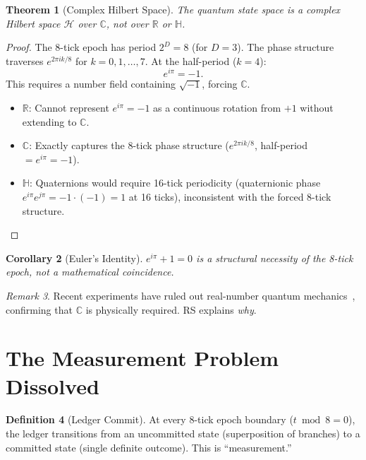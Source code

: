 \documentclass[12pt,a4paper]{article}
\newtheorem{theorem}{Theorem}[section]
\newtheorem{corollary}[theorem]{Corollary}
\theoremstyle{definition}
\newtheorem{definition}[theorem]{Definition}
\theoremstyle{remark}
\newtheorem{remark}[theorem]{Remark}
\begin{document}
\begin{theorem}[Complex Hilbert Space]
\label{thm:complex}
The quantum state space is a complex Hilbert space $\mathcal{H}$
over $\mathbb{C}$, not over $\mathbb{R}$ or $\mathbb{H}$.
\end{theorem}

\begin{proof}
The 8-tick epoch has period $2^D = 8$ (for $D = 3$).  The phase
structure traverses $e^{2\pi i k/8}$ for $k = 0, 1, \ldots, 7$.
At the half-period ($k = 4$):
\begin{equation}
  e^{i\pi} = -1.
\end{equation}
This requires a number field containing $\sqrt{-1}$, forcing
$\mathbb{C}$.
\begin{itemize}[nosep]
  \item $\mathbb{R}$: Cannot represent $e^{i\pi} = -1$ as a
  continuous rotation from $+1$ without extending to $\mathbb{C}$.
  \item $\mathbb{C}$: Exactly captures the 8-tick phase structure
  ($e^{2\pi i k/8}$, half-period $= e^{i\pi} = -1$).
  \item $\mathbb{H}$: Quaternions would require 16-tick
  periodicity (quaternionic phase $e^{i\pi}e^{j\pi} = -1 \cdot
  (-1) = 1$ at 16 ticks), inconsistent with the forced 8-tick
  structure.
\end{itemize}
\end{proof}

\begin{corollary}[Euler's Identity]
$e^{i\pi} + 1 = 0$ is a structural necessity of the 8-tick epoch,
not a mathematical coincidence.
\end{corollary}

\begin{remark}
Recent experiments have ruled out real-number quantum
mechanics~\cite{RealQM2022}, confirming that $\mathbb{C}$ is
physically required.  RS explains \emph{why}.
\end{remark}

\section{The Measurement Problem Dissolved}
\label{sec:measurement}

\begin{definition}[Ledger Commit]
At every 8-tick epoch boundary ($t \bmod 8 = 0$), the ledger
transitions from an uncommitted state (superposition of branches)
to a committed state (single definite outcome).  This is
``measurement.''
\end{definition}
\end{document}
